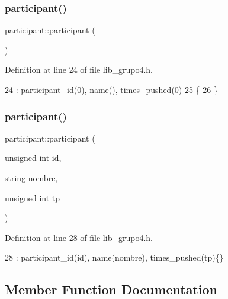 \subsubsection{\texorpdfstring{participant()}{participant()}\hspace{0.1cm}{\footnotesize\ttfamily [1/2]}}
{\footnotesize\ttfamily participant\+::participant (\begin{DoxyParamCaption}{ }\end{DoxyParamCaption})\hspace{0.3cm}{\ttfamily [inline]}}



Definition at line 24 of file lib\+\_\+grupo4.\+h.


\begin{DoxyCode}
24                      : participant\_id(0), name(), times\_pushed(0)
25         \{
26         \}   
\end{DoxyCode}
\mbox{\label{classparticipant_aa051b5d45d53d1ab5ac417006c90c76e}} 
\subsubsection{\texorpdfstring{participant()}{participant()}\hspace{0.1cm}{\footnotesize\ttfamily [2/2]}}
{\footnotesize\ttfamily participant\+::participant (\begin{DoxyParamCaption}\item[{unsigned int}]{id,  }\item[{string}]{nombre,  }\item[{unsigned int}]{tp }\end{DoxyParamCaption})\hspace{0.3cm}{\ttfamily [inline]}}



Definition at line 28 of file lib\+\_\+grupo4.\+h.


\begin{DoxyCode}
28 : participant\_id(\textcolor{keywordtype}{id}), name(nombre), times\_pushed(tp)\{\}
\end{DoxyCode}


\subsection{Member Function Documentation}
\mbox{\label{classparticipant_ab48b986f5c085ffff4bf71d2cd3778e9}} 
